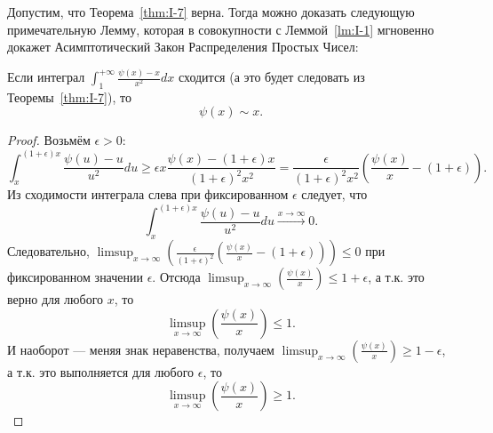 Допустим, что Теорема~\ref{thm:I-7} верна. Тогда можно доказать следующую примечательную Лемму, которая в совокупности с Леммой~\ref{lm:I-1} мгновенно докажет Асимптотический Закон Распределения Простых Чисел:
\begin{nlemma}
\label{lm:I-12}
    Если интеграл $\int_{1}^{+\infty} \frac{\psi(x) - x}{x^2}dx$ сходится (а это будет следовать из Теоремы~\ref{thm:I-7}), то
    \[
        \psi(x) \sim x.
    \]
\end{nlemma}
\begin{proof}
    Возьмём $\epsilon >0$:
    \[
        \int_x^{(1+\epsilon)x} \frac{\psi(u) - u}{u^2}du 
        \ge \epsilon x \frac{\psi(x) - (1 + \epsilon)x}{(1 + \epsilon)^2x^2} 
        = \frac{\epsilon}{\left(1 + \epsilon\right)^2x^2}\left(\frac{\psi(x)}{x} - (1 + \epsilon) \right).
    \]
    Из сходимости интеграла слева при фиксированном $\epsilon$ следует, что
    \[
        \int_x^{(1+\epsilon)x} \frac{\psi(u) - u}{u^2}du \xrightarrow{x \to \infty} 0.
    \]
    Следовательно, $\limsup_{x\to\infty}\left(\frac{\epsilon}{(1 + \epsilon)^2}\left( \frac{\psi(x)}{x} - (1 + \epsilon) \right)\right) \le 0$ при фиксированном значении $\epsilon$. Отсюда $\limsup_{x\to\infty} \left(\frac{\psi(x)}{x}\right) \le 1 + \epsilon$, а т.к. это верно для любого $x$, то 
    \[
        \limsup_{x\to\infty} \left(\frac{\psi(x)}{x}\right) \le 1.
    \]
    И наоборот --- меняя знак неравенства, получаем $\limsup_{x\to\infty} \left(\frac{\psi(x)}{x}\right) \ge 1 - \epsilon$, а т.к. это выполняется для любого $\epsilon$, то 
    \[
        \limsup_{x\to\infty} \left(\frac{\psi(x)}{x}\right) \ge 1.
    \]
\end{proof}


